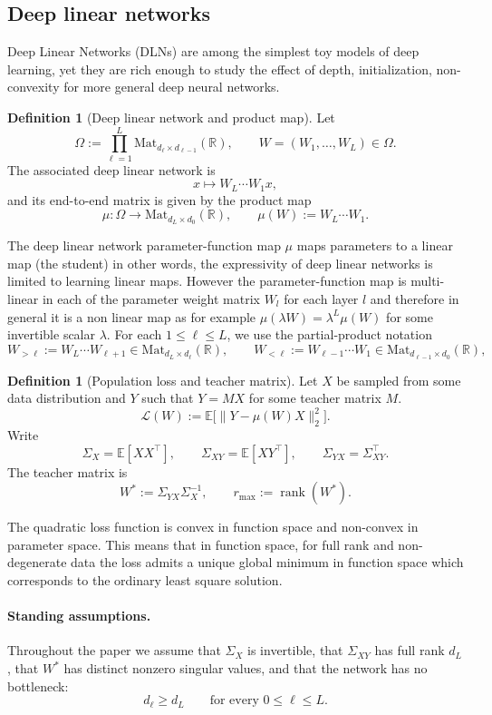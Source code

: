 \documentclass[11pt]{article}
\newcommand{\rk}{\operatorname{rank}}
\newcommand{\Mat}{\mathrm{Mat}}
\newcommand{\R}{\mathbb{R}}
\theoremstyle{definition}
\newtheorem{definition}[theorem]{Definition}
\begin{document}
\subsection{Deep linear networks}
Deep Linear Networks (DLNs) are among the simplest toy models of deep learning, yet they are rich enough to study the effect of depth, initialization, non-convexity for more general deep neural networks.  
\begin{definition}[Deep linear network and product map]
Let
\[
\Omega:=\prod_{\ell=1}^L \Mat_{d_\ell\times d_{\ell-1}}(\R),
\qquad
W=(W_1,\dots,W_L)\in \Omega.
\]
The associated deep linear network is
\[
x\longmapsto W_L\cdots W_1x,
\]
and its end-to-end matrix is given by the product map
\[
\mu:\Omega\to \Mat_{d_L\times d_0}(\R),
\qquad
\mu(W):=W_L\cdots W_1.
\]
\end{definition}
The deep linear network parameter-function map $\mu$ maps parameters to a linear map (the student) in other words, the expressivity of deep linear networks is limited to learning linear maps. However the parameter-function map is multi-linear in each of the parameter weight matrix $W_l$ for each layer $l$ and therefore in general it is a non linear map as for example $\mu(\lambda W) = \lambda^L \mu(W)$ for some invertible scalar $\lambda$.
For each \(1\leq \ell\leq L\), we use the partial-product notation
\[
W_{>\ell}:=W_L\cdots W_{\ell+1}\in \Mat_{d_L\times d_\ell}(\R),
\qquad
W_{<\ell}:=W_{\ell-1}\cdots W_1\in \Mat_{d_{\ell-1}\times d_0}(\R),
\]
\begin{definition}[Population loss and teacher matrix]
Let $X$ be sampled from some data distribution and $Y$ such that $Y=MX$ for some teacher matrix $M$.
\[
\mathcal L(W):=\mathbb E\bigl[\|Y-\mu(W)X\|_2^2\bigr].
\]
Write
\[
\Sigma_X=\mathbb E[XX^\top],
\qquad
\Sigma_{XY}=\mathbb E[XY^\top],
\qquad
\Sigma_{YX}=\Sigma_{XY}^\top.
\]
The teacher matrix is
\[
W^\ast:=\Sigma_{YX}\Sigma_X^{-1},
\qquad
r_{\max}:=\rk(W^\ast).
\]
\end{definition}
The quadratic loss function is convex in function space and non-convex in parameter space. This means that in function space, for full rank and non-degenerate data the loss admits a unique global minimum in function space which corresponds to the ordinary least square solution. 
\paragraph{Standing assumptions.}
Throughout the paper we assume that \(\Sigma_X\) is invertible, that
\(\Sigma_{XY}\) has full rank \(d_L\), that \(W^\ast\) has distinct nonzero
singular values, and that the network has no bottleneck:
\[
d_\ell\geq d_L
\qquad
\text{for every }0\leq \ell\leq L.
\]
\end{document}
